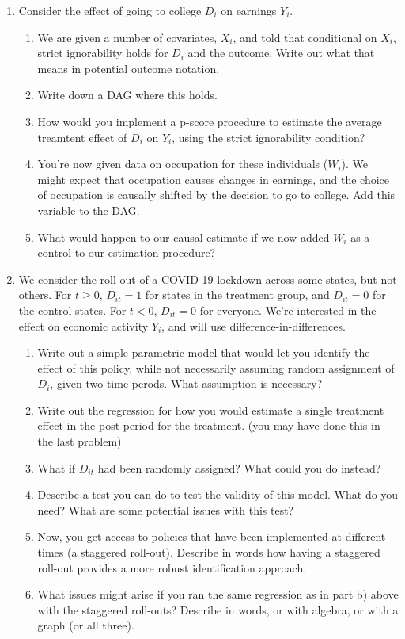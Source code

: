 \documentclass[11pt, a4paper]{article}
\begin{document}
\begin{enumerate}
\begin{enumerate}
    \end{enumerate}
  \item Consider the effect of going to college $D_{i}$ on earnings
    $Y_{i}$.
    \begin{enumerate}
    \item We are given a number of covariates, $X_{i}$, and told that
      conditional on $X_{i}$, strict ignorability holds for $D_{i}$
      and the outcome. Write out what that means in potential outcome notation.
    \item Write down a DAG where this holds.
    \item How would you implement a p-score procedure to estimate the
      average treamtent effect of $D_{i}$ on $Y_{i}$, using the strict
      ignorability condition?
    \item You're now given data on occupation for these individuals
      ($W_{i}$). We might expect that occupation causes changes in
      earnings, and the choice of occupation is causally shifted by
      the decision to go to college. Add this variable to the DAG.
    \item What would happen to our causal estimate if we now added
      $W_{i}$ as a control to our estimation procedure?
    \end{enumerate}
  \item We consider the roll-out of a COVID-19 lockdown across some
    states, but not others. For $t \geq 0$, $D_{it} = 1$ for states in
    the treatment group, and $D_{it} = 0$ for the control states. For
    $t < 0$, $D_{it} = 0$ for everyone. We're interested in the effect
    on economic activity $Y_{i}$, and will use difference-in-differences.
    \begin{enumerate}
    \item Write out a simple parametric model that would let you
      identify the effect of this policy, while not necessarily
      assuming random assignment of $D_{i}$, given two time
      perods. What assumption is necessary?
    \item Write out the regression for how you would estimate a single
      treatment effect in the post-period for the treatment. (you may have done this in the last problem)
    \item What if $D_{it}$ had been randomly assigned? What could you do instead?
    \item Describe a test you can do to test the validity of this
      model. What do you need? What are some potential issues with
      this test?
    \item Now, you get access to policies that have been implemented
      at different times (a staggered roll-out). Describe in words how
      having a staggered roll-out provides a more robust
      identification approach.
    \item What issues might arise if you ran the same regression as in
      part b) above with the staggered roll-outs?  Describe in words,
      or with algebra, or with a graph (or all three). 
    \end{enumerate}



\end{enumerate}
\end{document}
